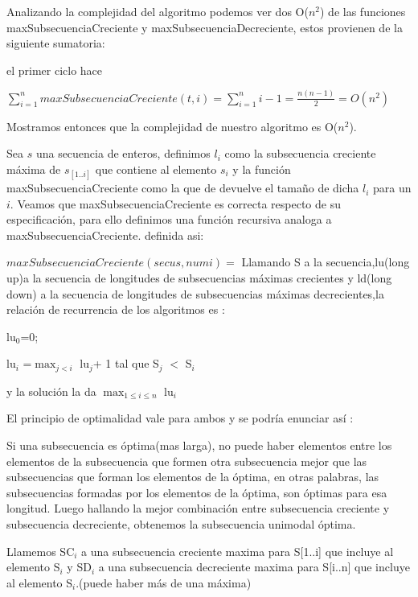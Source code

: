 Analizando la complejidad del algoritmo podemos ver dos O($n^{2}$) de las funciones maxSubsecuenciaCreciente y maxSubsecuenciaDecreciente, estos provienen de la siguiente sumatoria:

el primer ciclo hace

$\sum_{i=1}^n maxSubsecuenciaCreciente(t, i) = \sum_{i=1}^{n} i-1  = \frac{n(n-1)}{2} = O(n^{2})$

                       
Mostramos entonces que la complejidad de nuestro algoritmo es O($n^{2}$).




Sea $s$ una secuencia de enteros, definimos $l_i$ como la subsecuencia creciente máxima de $s_[1..i]$ que contiene al elemento $s_i$ y la función maxSubsecuenciaCreciente como la que de devuelve el tamaño de dicha $l_i$ para un $i$. Veamos que maxSubsecuenciaCreciente es correcta respecto de su especificación, para ello definimos una función recursiva analoga a maxSubsecuenciaCreciente. definida asi:

$ maxSubsecuenciaCreciente(secu s, num i) = { } $
Llamando S a la secuencia,lu(long up)a la secuencia de longitudes de subsecuencias máximas crecientes  y ld(long down) a la secuencia de longitudes de subsecuencias máximas decrecientes,la relación de recurrencia de los algoritmos es :

lu$_0$=0;

lu$_i$ =$\max_{j<i}$ lu$_j$+ 1  tal que S$_j$ $<$ S$_i$  

y la solución la da $\max_{1\leq i\leq n}$ lu$_i$



El principio de optimalidad vale para ambos y se podría enunciar así : 

Si una subsecuencia es óptima(mas larga), no puede haber elementos entre los elementos de la subsecuencia que formen otra subsecuencia mejor que las subsecuencias que forman los elementos de la óptima, en otras palabras, las subsecuencias formadas por los elementos de la óptima, son óptimas para esa longitud.
Luego hallando la mejor combinación entre subsecuencia creciente y subsecuencia decreciente, obtenemos la subsecuencia unimodal óptima. 


Llamemos SC${_i}$ a una subsecuencia creciente maxima para S[1..i] que incluye al elemento S$_i$ y SD${_i}$ a una subsecuencia decreciente maxima para S[i..n] que incluye al elemento S${_i}$.(puede haber más de una máxima)

